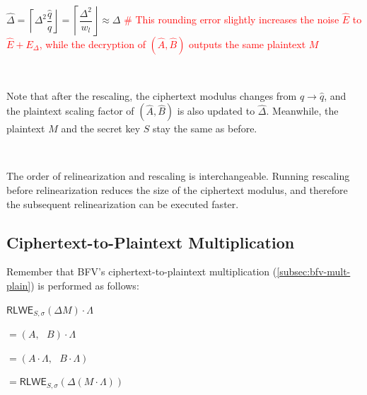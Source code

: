 \begin{tcolorbox}[title={\textbf{\tboxlabel{\ref*{subsubsec:ckks-mult-cipher-summary}} CKKS's Ciphertext-to-Ciphertext Multiplication}}]
\begin{enumerate}
$\hat{\Delta} = \left\lceil\Delta^2\dfrac{\hat{q}}{q}\right\rfloor = \left\lceil\dfrac{\Delta^2}{w_l}\right\rfloor \approx \Delta$ \textcolor{red}{ \# This rounding error slightly increases the noise $\hat E$ to $\hat E + E_\Delta$, while the decryption of $(\hat A, \hat B)$ outputs the same plaintext $M$}

$ $


Note that after the rescaling, the ciphertext modulus changes from $q \rightarrow \hat q$, and the plaintext scaling factor of $(\hat A, \hat B)$ is also updated to $\hat \Delta$. Meanwhile, the plaintext $M$ and the secret key $S$ stay the same as before.

$ $

\end{enumerate}

 The order of relinearization and rescaling is interchangeable. Running rescaling before relinearization reduces the size of the ciphertext modulus, and therefore the subsequent relinearization can be executed faster. 

\end{tcolorbox}


\subsection{Ciphertext-to-Plaintext Multiplication}
\label{subsec:ckks-mult-plain}

Remember that BFV's ciphertext-to-plaintext multiplication (\autoref{subsec:bfv-mult-plain}) is performed as follows:

$\textsf{RLWE}_{S, \sigma}(\Delta M) \cdot \Lambda$

$= (A, \text{ } B) \cdot \Lambda$

$= (A \cdot \Lambda, \text{ }  B \cdot \Lambda )$

$= \textsf{RLWE}_{S, \sigma}(\Delta (M \cdot \Lambda) )$

